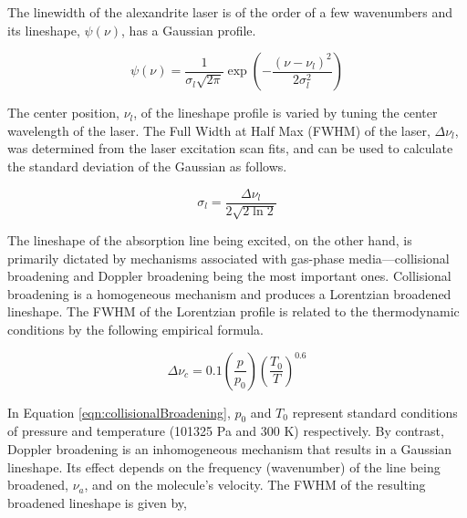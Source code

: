 

The linewidth of the alexandrite laser is of the order of a few wavenumbers and its lineshape, \(\psi(\nu)\), has a Gaussian profile.\cite{2007-li-a}

\begin{equation}
  \psi(\nu) = \frac{1}{\sigma_l\sqrt{2\pi}} \exp{\left(-\dfrac{(\nu-\nu_l)^2}{2\sigma_l^2}\right)}
  \label{eqn:laserLineShape}
\end{equation}

The center position, \(\nu_l\), of the lineshape profile is varied by tuning the center wavelength of the laser.
The Full Width at Half Max (FWHM) of the laser, \(\Delta\nu_l\), was determined from the laser excitation scan fits, and can be used to calculate the standard deviation of the Gaussian as follows.

\begin{equation}
  \sigma_l = \frac{\Delta\nu_l}{2 \sqrt{ 2 \ln{2} } }
\end{equation}


The lineshape of the absorption line being excited, on the other hand, is primarily dictated by mechanisms associated with gas-phase media---collisional broadening and Doppler broadening being the most important ones.
Collisional broadening is a homogeneous mechanism and produces a Lorentzian broadened lineshape.
The FWHM of the Lorentzian profile is related to the thermodynamic conditions by the following empirical formula.

\begin{equation}
  \Delta\nu_c = 0.1 \left(\frac{p}{p_0}\right) \left(\frac{T_0}{T}\right)^{0.6}
  \label{eqn:collisionalBroadening}
\end{equation}


In Equation \ref{eqn:collisionalBroadening}, \(p_0\) and \(T_0\) represent standard conditions of pressure and temperature (101325 Pa and 300 K) respectively.
By contrast, Doppler broadening is an inhomogeneous mechanism that results in a Gaussian lineshape.
Its effect depends on the frequency (wavenumber) of the line being broadened, \(\nu_a\), and on the molecule's velocity.
The FWHM of the resulting broadened lineshape is given by,

